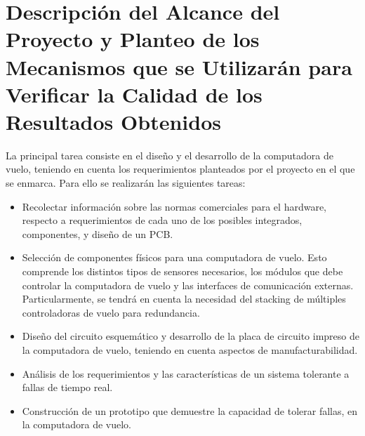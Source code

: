 \section{Descripción del Alcance del Proyecto y Planteo de los Mecanismos que se Utilizarán para Verificar la Calidad de los Resultados Obtenidos}

La principal tarea consiste en el diseño y el desarrollo de la computadora de vuelo, teniendo en cuenta los requerimientos planteados por el proyecto en el que se enmarca. Para ello se realizarán las siguientes tareas:

\begin{itemize}
    \item Recolectar información sobre las normas comerciales para el hardware, respecto a requerimientos de cada uno de los posibles integrados, componentes, y diseño de un PCB. %
    \item Selección de componentes físicos para una computadora de vuelo. Esto comprende los distintos tipos de sensores necesarios, los módulos que debe controlar la computadora de vuelo y las interfaces de comunicación externas. Particularmente, se tendrá en cuenta la necesidad del stacking de múltiples controladoras de vuelo para redundancia.
    \item Diseño del circuito esquemático y desarrollo de la placa de circuito impreso de la computadora de vuelo, teniendo en cuenta aspectos de manufacturabilidad.
    \item Análisis de los requerimientos y las características de un sistema tolerante a fallas de tiempo real.
    \item Construcción de un prototipo que demuestre la capacidad de tolerar fallas, en la computadora de vuelo. 
\end{itemize}
